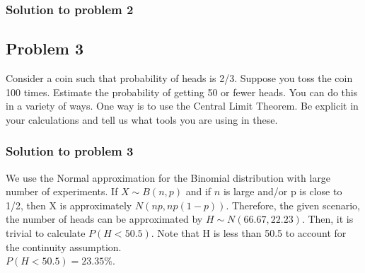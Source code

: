 \documentclass[12pt]{article}%
\begin{document}
\subsubsection{Solution to problem 2}


\subsection{Problem 3}

Consider a coin such that probability of heads is 2/3. Suppose you toss the coin 100 times. Estimate the probability of getting 50 or fewer heads. You can do this in a variety of ways. One way is to use the Central Limit Theorem. Be explicit in your calculations and tell us what tools you are using in these.

\subsubsection{Solution to problem 3}

We use the Normal approximation for the Binomial distribution with large number of experiments. If $X \sim B(n, p)$ and if $n$ is large and/or p is close to 1/2, then X is approximately $N(np, np(1-p))$. Therefore, the given scenario, the number of heads can be approximated by $H \sim N(66.67, 22.23)$. Then, it is trivial to calculate $P(H<50.5)$. Note that H is less than 50.5 to account for the continuity assumption.\\

\noindent $P(H<50.5) = 23.35\%$.

\end{document}
